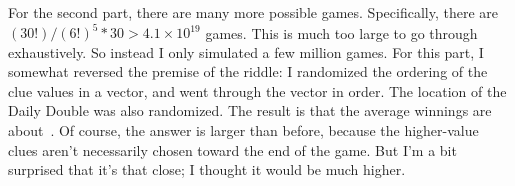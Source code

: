 \documentclass{article}
\begin{document}
For the second part, there are many more possible games.
Specifically, there are $(30!)/(6!)^{5}*30>4.1\times10^{19}$ games.
This is much too large to go through exhaustively.
So instead I only simulated a few million games.
For this part, I somewhat reversed the premise of the riddle: I randomized the ordering of the clue values in a vector, and went through the vector in order.
The location of the Daily Double was also randomized.
The result is that the average winnings are about
\,.
Of course, the answer is larger than before, because the higher-value clues aren't necessarily chosen toward the end of the game.
But I'm a bit surprised that it's that close; I thought it would be much higher.
\end{document}
